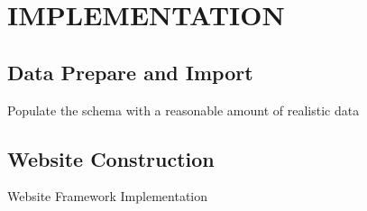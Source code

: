 \section{IMPLEMENTATION}
\label{section:implementation}

\subsection{Data Prepare and Import}
\label{sect:sub-title}
Populate the schema with a reasonable amount of realistic data

\subsection{Website Construction}
\label{sect:sub-title}
Website Framework Implementation

